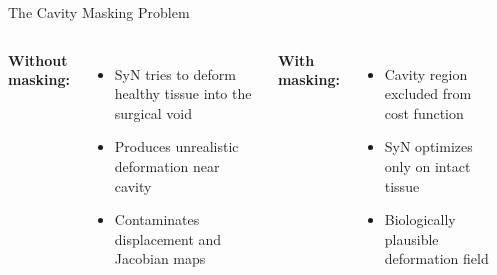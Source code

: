 \begin{frame}{The Cavity Masking Problem}

  \begin{columns}[T]
    \textbf{Without masking:}
    \begin{itemize}
      \item SyN tries to deform healthy tissue into the surgical void
      \item Produces unrealistic deformation near cavity
      \item Contaminates displacement and Jacobian maps
    \end{itemize}

    \bigskip

    \textbf{With masking:}
    \begin{itemize}
      \item Cavity region excluded from cost function
      \item SyN optimizes only on intact tissue
      \item Biologically plausible deformation field
    \end{itemize}

    \begin{center}
    \end{center}
  \end{columns}

\end{frame}

